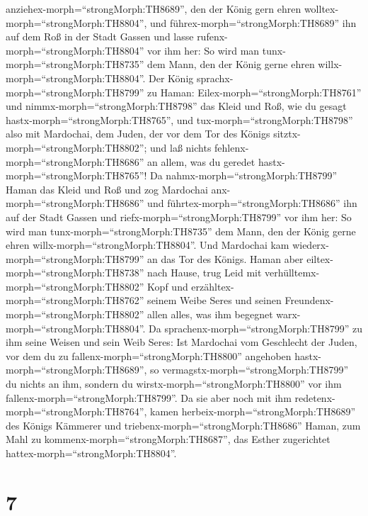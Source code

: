 anziehex-morph=``strongMorph:TH8689'', den der König gern ehren
wolltex-morph=``strongMorph:TH8804'', und
führex-morph=``strongMorph:TH8689'' ihn auf dem Roß in der Stadt Gassen
und lasse rufenx-morph=``strongMorph:TH8804'' vor ihm her: So wird man
tunx-morph=``strongMorph:TH8735'' dem Mann, den der König gerne ehren
willx-morph=``strongMorph:TH8804''.  Der König
sprachx-morph=``strongMorph:TH8799'' zu Haman:
Eilex-morph=``strongMorph:TH8761'' und
nimmx-morph=``strongMorph:TH8798'' das Kleid und Roß, wie du gesagt
hastx-morph=``strongMorph:TH8765'', und tux-morph=``strongMorph:TH8798''
also mit Mardochai, dem Juden, der vor dem Tor des Königs
sitztx-morph=``strongMorph:TH8802''; und laß nichts
fehlenx-morph=``strongMorph:TH8686'' an allem, was du geredet
hastx-morph=``strongMorph:TH8765''!  Da
nahmx-morph=``strongMorph:TH8799'' Haman das Kleid und Roß und zog
Mardochai anx-morph=``strongMorph:TH8686'' und
führtex-morph=``strongMorph:TH8686'' ihn auf der Stadt Gassen und
riefx-morph=``strongMorph:TH8799'' vor ihm her: So wird man
tunx-morph=``strongMorph:TH8735'' dem Mann, den der König gerne ehren
willx-morph=``strongMorph:TH8804''.  Und Mardochai kam
wiederx-morph=``strongMorph:TH8799'' an das Tor des Königs. Haman aber
eiltex-morph=``strongMorph:TH8738'' nach Hause, trug Leid mit
verhülltemx-morph=``strongMorph:TH8802'' Kopf  und
erzähltex-morph=``strongMorph:TH8762'' seinem Weibe Seres und seinen
Freundenx-morph=``strongMorph:TH8802'' allen alles, was ihm begegnet
warx-morph=``strongMorph:TH8804''. Da
sprachenx-morph=``strongMorph:TH8799'' zu ihm seine Weisen und sein Weib
Seres: Ist Mardochai vom Geschlecht der Juden, vor dem du zu
fallenx-morph=``strongMorph:TH8800'' angehoben
hastx-morph=``strongMorph:TH8689'', so
vermagstx-morph=``strongMorph:TH8799'' du nichts an ihm, sondern du
wirstx-morph=``strongMorph:TH8800'' vor ihm
fallenx-morph=``strongMorph:TH8799''.  Da sie aber noch mit
ihm redetenx-morph=``strongMorph:TH8764'', kamen
herbeix-morph=``strongMorph:TH8689'' des Königs Kämmerer und
triebenx-morph=``strongMorph:TH8686'' Haman, zum Mahl zu
kommenx-morph=``strongMorph:TH8687'', das Esther zugerichtet
hattex-morph=``strongMorph:TH8804''.

\hypertarget{section-6}{%
\section{7}\label{section-6}}

